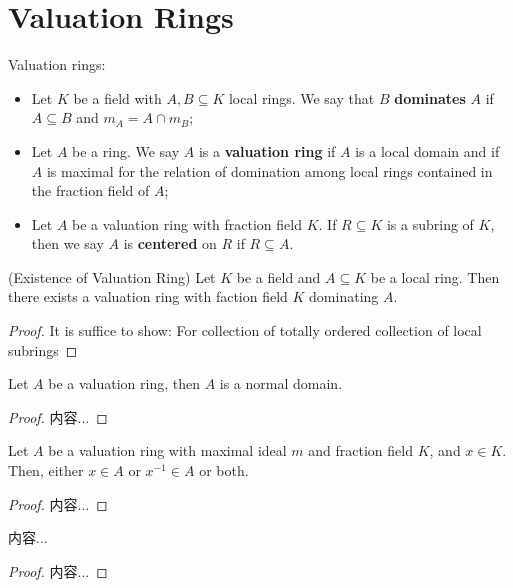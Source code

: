 \documentclass[Total.tex]{subfiles}
\begin{document}
	\chapter{Valuation Rings}
	\begin{Def}
		Valuation rings:
		\begin{itemize}
			\item Let $K$ be a field with $A,B\subseteq K$ local rings. We say that $B$ \textbf{dominates} $A$ if $A\subseteq B$ and $m_A=A\cap m_B$;
			\item Let $A$ be a ring. We say $A$ is a \textbf{valuation ring} if $A$ is a local domain and if $A$ is maximal for the relation of domination among local rings contained in the fraction field of $A$;
			\item Let $A$ be a valuation ring with fraction field $K$. If $R\subseteq K$ is a subring of $K$, then we say $A$ is \textbf{centered} on $R$ if $R\subseteq A$.
		\end{itemize}
	\end{Def}
	
	\begin{lemma}
		(Existence of Valuation Ring) Let $K$ be a field and $A\subseteq K$ be a local ring. Then there exists a valuation ring with faction field $K$ dominating $A$.
	\end{lemma}
	\begin{proof}
		It is suffice to show: For collection of totally ordered collection of local subrings 
	\end{proof}
	
	\begin{lemma}
		Let $A$ be a valuation ring, then $A$ is a normal domain.
	\end{lemma}
	\begin{proof}
		内容...
	\end{proof}
	
	\begin{lemma}
		Let $A$ be a valuation ring with maximal ideal $m$ and fraction field $K$, and $x\in K$. Then, either $x\in A$ or $x^{-1}\in A$ or both.
	\end{lemma}
	\begin{proof}
		内容...
	\end{proof}
	\begin{lemma}
		内容...
	\end{lemma}
	\begin{proof}
		内容...
	\end{proof}
\end{document}
